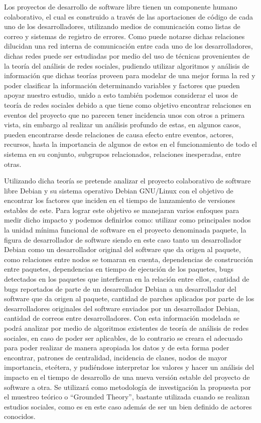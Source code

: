 \documentclass[letterpaper,12pt,titlepage]{report}
\begin{document}
Los proyectos de desarrollo de software libre tienen un componente
humano colaborativo, el cual es construido a través de las
aportaciones de código de cada uno de los desarrolladores, utilizando
medios de comunicación como listas de correo y sistemas de registro de
errores. Como puede notarse dichas relaciones dilucidan una red
interna de comunicación entre cada uno de los desarrolladores, dichas
redes puede ser estudiadas por medio del uso de técnicas provenientes
de la teoría del análisis de redes sociales, pudiendo utilizar
algoritmos y análisis de información que dichas teorías proveen
para modelar de una mejor forma la red y poder clasificar la
información determinando variables y factores que pueden apoyar
nuestro estudio, unido a esto también podemos considerar el usos de teoría
de redes sociales  debido a que tiene como objetivo encontrar relaciones en eventos del proyecto que
no parecen tener incidencia unos con otros a primera vista, sin
embargo al realizar un análisis profundo de estas, en algunos casos,
pueden encontrarse desde relaciones de causa efecto entre eventos,
actores, recursos, hasta la importancia de algunos de estos en el
funcionamiento de todo el sistema en su conjunto, subgrupos
relacionados, relaciones inesperadas, entre otras.

Utilizando dicha teoría se pretende analizar el proyecto colaborativo
de software libre Debian y su sistema operativo Debian GNU/Linux con
el objetivo de encontrar los factores que inciden en el tiempo de
lanzamiento de versiones estables de este.  Para lograr este objetivo
se manejaran varios enfoques para medir dicho impacto y podemos
definirlos como: utilizar como principales nodos la unidad mínima
funcional de software en el proyecto denominada paquete, la figura de
desarrollador de software siendo en este caso tanto un desarrollador
Debian como un desarrollador original del software que da origen al
paquete, como relaciones entre nodos se tomaran en cuenta,
dependencias de construcción entre paquetes, dependencias en tiempo de
ejecución de los paquetes, bugs detectados en los paquetes que
interfieran en la relación entre ellos, cantidad de bugs reportados de
parte de un desarrollador Debian a un desarrollador del software que
da origen al paquete, cantidad de parches aplicados por parte de los
desarrolladores originales del software enviados por un desarrollador
Debian, cantidad de correos entre desarrolladores.  Con esta
información modelada se podrá analizar por medio de algoritmos
existentes de teoría de análisis de redes sociales, en caso de poder
ser aplicables, de lo contrario se creara el adecuado para poder
realizar de manera apropiada los datos y de esta forma poder
encontrar, patrones de centralidad, incidencia de clanes, nodos de
mayor importancia, etcétera, y pudiéndose interpretar los valores y
hacer un análisis del impacto en el tiempo de desarrollo de una nueva
versión estable del proyecto de software a otra.  Se utilizará como
metodología de investigación la propuesta por el muestreo teórico o
``Grounded Theory'', bastante utilizada cuando se realizan estudios
sociales, como es en este caso además de ser un bien definido de
actores conocidos.
\end{document}
